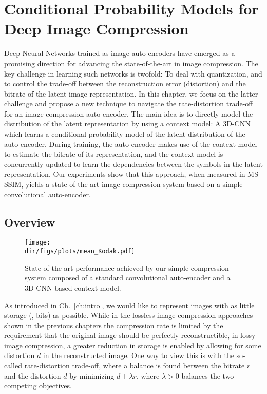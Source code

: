 
\chapter{Conditional Probability Models for Deep Image Compression} \label{ch:imgcomp}

Deep Neural Networks trained as image auto-encoders have emerged as a
promising direction for advancing the state-of-the-art in image compression.
The key challenge in learning such networks is twofold: To deal with
quantization, and to control the trade-off between the reconstruction error
(distortion) and the bitrate of the latent image representation.  In this
chapter, we focus on the latter challenge and propose a new technique to navigate
the rate-distortion trade-off for an image compression auto-encoder.  The main
idea is to directly model the distribution of the latent representation by using a
context model: A 3D-CNN which learns a conditional probability model of the
latent distribution of the auto-encoder.  During training, the auto-encoder
makes use of the context model to estimate the bitrate of its representation,
and the context model is concurrently updated to learn the dependencies between
the symbols in the latent representation.  Our experiments show that this
approach, when measured in MS-SSIM, yields a state-of-the-art image compression
system based on a simple convolutional auto-encoder.

\section{Overview}

\begin{figure}
\centering
\texttt{[image: \\dir/figs/plots/mean\_Kodak.pdf]}
\caption{State-of-the-art performance achieved by our simple compression system composed of a standard convolutional auto-encoder and a 3D-CNN-based context model.}
\label{imgc:fig:mean_kodak}
\end{figure}

As introduced in Ch.~\ref{ch:intro},
we would like to represent images with as little
storage (\ie, bits) as possible.  While in the lossless image compression
approaches shown in the previous chapters the compression rate is limited by
the requirement that the original image should be perfectly reconstructible, in
lossy image compression, a greater reduction in storage is enabled by allowing
for some distortion $d$ in the reconstructed image. One way to view this is
with the so-called rate-distortion trade-off, where a balance is found between
the bitrate $r$ and the distortion $d$ by minimizing $d + \lambda r$, where
$\lambda>0$ balances the two competing objectives.

